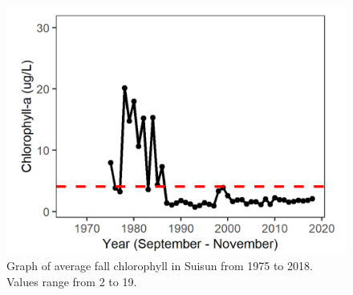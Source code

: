 \documentclass[
]{book}
\begin{document}
\begin{panel-grid}
\begin{columns-nocenter}
\begin{column800}
\begin{expand}
\end{expand}

\end{column800}

\begin{column40}

~

\end{column40}

\begin{column800}

\begin{expand}

\begin{figure}
\includegraphics[width=15.25in]{figures/chla_ssfall} \caption{Graph of average fall chlorophyll in Suisun from 1975 to 2018. Values range from 2 to 19.}\label{fig:unnamed-chunk-109}
\end{figure}

\end{expand}

\end{column800}

\begin{column40}

~

\end{column40}

\begin{column800}

\begin{expand}


\end{expand}
\end{column800}
\end{columns-nocenter}
\end{panel-grid}
\end{document}
